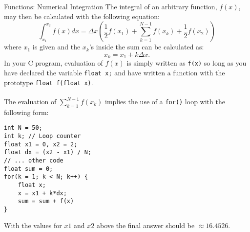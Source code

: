 \documentclass{lab}
\begin{document}
\begin{task}{Functions: Numerical Integration}{}
The integral of an arbitrary function, $f(x)$, may then be calculated with the following equation:
\begin{equation}
\int_{x_1}^{x_2} f(x) dx = \Delta x \left( \frac{1}{2} f(x_1) + \sum_{k=1}^{N-1} f(x_k) + \frac{1}{2} f(x_2) \right)
\end{equation}
where $x_1$ is given and the $x_k$'s inside the sum can be calculated as:
\begin{equation*}
x_k = x_1 + k \Delta x.
\end{equation*}
In your C program, evaluation of $f(x)$ is simply written as \texttt{f(x)} so long as you have declared the variable \texttt{float x;} and have written a function with the prototype \texttt{float f(float x)}.
\\~\\
The evaluation of $\sum_{k=1}^{N-1} f(x_k)$ implies the use of a \texttt{for()} loop with the following form:
\begin{lstlisting}[style=CStyle]
int N = 50;
int k; // Loop counter
float x1 = 0, x2 = 2;
float dx = (x2 - x1) / N;
// ... other code
float sum = 0;
for(k = 1; k < N; k++) {
	float x;
	x = x1 + k*dx;
	sum = sum + f(x)
}
\end{lstlisting}
With the values for $x1$ and $x2$ above the final answer should be $\approx 16.4526$.
\end{task}
\end{document}
